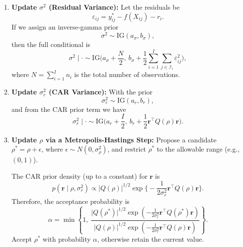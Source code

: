 \documentclass[useAMS,referee]{biom}
\begin{document}
\begin{enumerate}
\begin{enumerate}
        Let $N=\operatorname{diag}(n_1,\ldots,n_I)$. Then the full conditional for $\bm{r}$ is
        \[
        \bm{r}\mid \cdot \sim \mathcal{N}\Bigl(\Lambda^{-1}\bm{b},\, \Lambda^{-1}\Bigr),\quad \text{with } \Lambda = \frac{N}{\sigma^2} + \frac{Q(\rho)}{\sigma_r^2}.
        \]
        
        \textbf{Derivation:}  
        The log-likelihood (up to constants) is
        \[
        -\frac{1}{2\sigma^2}\sum_{i=1}^I\sum_{j\in \mathcal{I}_i}\Big[y_{ij}^\ast-f(X_{ij})-r_i\Big]^2 
        = -\frac{1}{2\sigma^2}\sum_{i=1}^I n_i \Big(r_i-\mu_i^\ast\Big)^2.
        \]
        The CAR prior gives
        \[
        -\frac{1}{2\sigma_r^2}\bm{r}^\top Q(\rho) \bm{r}.
        \]
        Adding these yields a quadratic form in $\bm{r}$, which when completed squares results in the stated multivariate normal conditional.
      
      \item \textbf{Update $\sigma^2$ (Residual Variance):}  
        Let the residuals be
        \[
        \varepsilon_{ij} = y_{ij}^\ast - f(X_{ij}) - r_i.
        \]
        If we assign an inverse-gamma prior 
        \[
        \sigma^2 \sim \text{IG}(a_\sigma,b_\sigma),
        \]
        then the full conditional is
        \[
        \sigma^2 \mid \cdot \sim \text{IG}\!\Biggl(a_\sigma+\frac{N}{2},\ b_\sigma+\frac{1}{2}\sum_{i=1}^I\sum_{j\in \mathcal{I}_i} \varepsilon_{ij}^2\Biggr),
        \]
        where $N=\sum_{i=1}^I n_i$ is the total number of observations.
      
      \item \textbf{Update $\sigma_r^2$ (CAR Variance):}  
        With the prior
        \[
        \sigma_r^2 \sim \text{IG}(a_r,b_r),
        \]
        and from the CAR prior term we have
        \[
        \sigma_r^2 \mid \cdot \sim \text{IG}\!\Biggl(a_r+\frac{I}{2},\ b_r+\frac{1}{2}\bm{r}^\top Q(\rho)\bm{r}\Biggr).
        \]
      
      \item \textbf{Update $\rho$ via a Metropolis-Hastings Step:}  
        Propose a candidate $\rho^\ast = \rho + \epsilon$, where $\epsilon \sim N(0,\sigma_{\rho}^2)$, and restrict $\rho^\ast$ to the allowable range (e.g., $(0,1)$).  
        
        The CAR prior density (up to a constant) for $\bm{r}$ is
        \[
        p(\bm{r}\mid \rho,\sigma_r^2) \propto \vert Q(\rho)\vert^{1/2} \exp\!\Biggl\{-\frac{1}{2\sigma_r^2}\bm{r}^\top Q(\rho)\bm{r}\Biggr\}.
        \]
        Therefore, the acceptance probability is
        \[
        \alpha = \min\left\{1,\ \frac{\vert Q(\rho^\ast)\vert^{1/2}\exp\!\left(-\frac{1}{2\sigma_r^2}\bm{r}^\top Q(\rho^\ast)\bm{r}\right)}
        {\vert Q(\rho)\vert^{1/2}\exp\!\left(-\frac{1}{2\sigma_r^2}\bm{r}^\top Q(\rho)\bm{r}\right)}\right\}.
        \]
        Accept $\rho^\ast$ with probability $\alpha$, otherwise retain the current value.
    \end{enumerate}
    

\end{enumerate}
\end{document}
